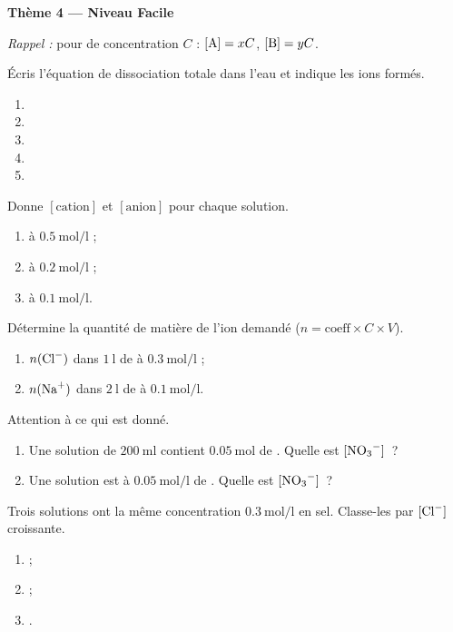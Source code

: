 \documentclass[11pt,a4paper]{article}
\begin{document}
\begin{center}{\large\bfseries\color{primarydark} Thème 4 — Niveau Facile}\end{center}
\emph{Rappel :} pour  de concentration $C$ : $[\ce{A}]=xC$, $[\ce{B}]=yC$.

\begin{exo}
Écris l'équation de dissociation totale dans l'eau et indique les ions formés.
\begin{enumerate}[label=\alph*)]
  \item {}
  \item {}
  \item {}
  \item {}
  \item {}
\end{enumerate}
\end{exo}

\begin{exo}
Donne $[\text{cation}]$ et $[\text{anion}]$ pour chaque solution.
\begin{enumerate}[label=\alph*)]
  \item {} à $\SI{0.5}{\mole\per\litre}$ ;
  \item {} à $\SI{0.2}{\mole\per\litre}$ ;
  \item {} à $\SI{0.1}{\mole\per\litre}$.
\end{enumerate}
\end{exo}

\begin{exo}
Détermine la quantité de matière de l'ion demandé ($n = \text{coeff}\times C\times V$).
\begin{enumerate}[label=\alph*)]
  \item $n(\ce{Cl-})$ dans $\SI{1}{\litre}$ de  à $\SI{0.3}{\mole\per\litre}$ ;
  \item $n(\ce{Na+})$ dans $\SI{2}{\litre}$ de  à $\SI{0.1}{\mole\per\litre}$.
\end{enumerate}
\end{exo}

\begin{exo}
Attention à ce qui est donné.
\begin{enumerate}[label=\alph*)]
  \item Une solution de $\SI{200}{\milli\litre}$ contient $\SI{0.05}{\mole}$ de .
        Quelle est $[\ce{NO3-}]$~?
  \item Une solution est à $\SI{0.05}{\mole\per\litre}$ de . Quelle est $[\ce{NO3-}]$~?
\end{enumerate}
\end{exo}

\begin{exo}
Trois solutions ont la même concentration $\SI{0.3}{\mole\per\litre}$ en sel. Classe-les par
$[\ce{Cl-}]$ croissante.
\begin{enumerate}[label=\alph*)]
  \item {} ;
  \item {} ;
  \item {}.
\end{enumerate}
\end{exo}
\end{document}
